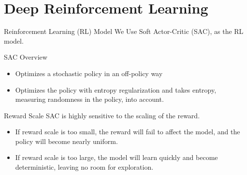 \section{Deep Reinforcement Learning}


\begin{frame}{Reinforcement Learning (RL) Model}
We Use Soft Actor-Critic (SAC), as the RL model.
\begin{block}{SAC Overview}
\begin{itemize}
    \item Optimizes a stochastic policy in an off-policy way
    \item Optimizes the policy with \alert{entropy regularization} and takes entropy, measuring randomness in the policy, into account.
\end{itemize}
\end{block}
\begin{alertblock}{Reward Scale}
SAC is highly sensitive to the scaling of the reward. 
\begin{itemize}
    \item If reward scale is too small, the reward will fail to affect the model, and the policy will become nearly uniform.
    \item If reward scale is too large, the model will learn quickly and become deterministic, leaving no room for exploration.
\end{itemize}
\end{alertblock}
\end{frame}